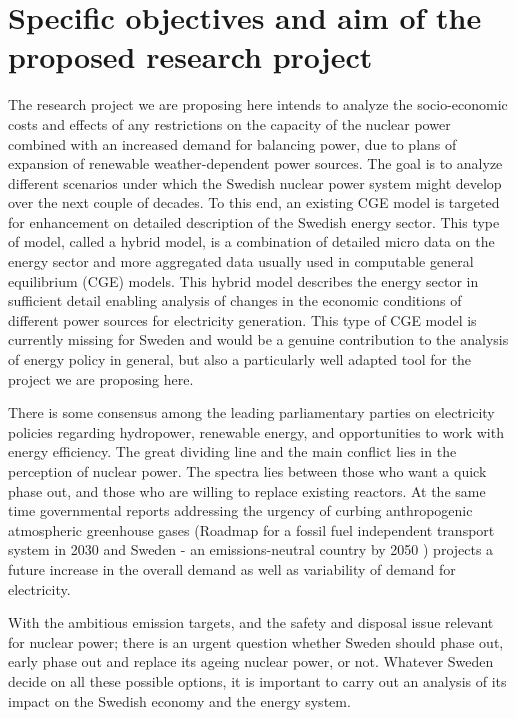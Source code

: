 \section{Specific objectives and aim of the proposed research project}
The research project we are proposing here intends to analyze the socio-economic costs and effects of any restrictions on the capacity of the nuclear power combined with an increased demand for balancing power, due to plans of expansion of renewable weather-dependent power sources. The goal is to analyze different scenarios under which the Swedish nuclear power system might develop over the next couple of decades. To this end, an existing CGE model is targeted for enhancement on detailed description of the Swedish energy sector. This type of model, called a hybrid model, is a combination of detailed micro data on the energy sector and more aggregated data usually used in computable general equilibrium (CGE) models. This hybrid model describes the energy sector in sufficient detail enabling analysis of changes in the economic conditions of different power sources for electricity generation. This type of CGE model is currently missing for Sweden and would be a genuine contribution to the analysis of energy policy in general, but also a particularly well adapted tool for the project we are proposing here.

There is some consensus among the leading parliamentary parties on electricity policies regarding hydropower, renewable energy, and opportunities to work with energy efficiency. The great dividing line and the main conflict lies in the perception of nuclear power. The spectra lies between those who want a quick phase out, and those who are willing to replace existing reactors. At the same time governmental reports addressing the urgency of curbing anthropogenic atmospheric greenhouse gases (Roadmap for a fossil fuel independent transport system in 2030 \cite{SOU201384} and Sweden - an emissions-neutral country by 2050 \cite{sepa2012}) projects a future increase in the overall demand as well as variability of demand for electricity.

With the ambitious emission targets, and the safety and disposal issue relevant for nuclear power; there is an urgent question whether Sweden should phase out, early phase out and replace its ageing nuclear power, or not. Whatever Sweden decide on all these possible options, it is important to carry out an analysis of its impact on the Swedish economy and the energy system.

